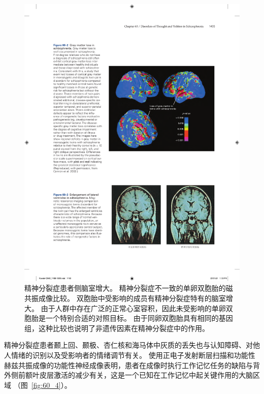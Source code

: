 \begin{figure}[htbp]
	\centering
	\includegraphics[width=0.88\linewidth]{chap60/fig_60_3}
	\caption{精神分裂症患者侧脑室增大。
		精神分裂症不一致的单卵双胞胎的磁共振成像比较。
		双胞胎中受影响的成员有精神分裂症特有的脑室增大。
		由于人群中存在广泛的正常心室容积，因此未受影响的单卵双胞胎是一个特别合适的对照目标。
		由于同卵双胞胎具有相同的基因组，这种比较也说明了非遗传因素在精神分裂症中的作用。}
	\label{fig:60_3}
\end{figure}


精神分裂症患者颞上回、颞极、杏仁核和海马体中灰质的丢失也与认知障碍、对他人情绪的识别以及受影响者的情绪调节有关。
使用正电子发射断层扫描和功能性赫兹共振成像的功能性神经成像表明，患者在成像时执行工作记忆任务的缺陷与背外侧前额叶皮层激活的减少有关，这是一个已知在工作记忆中起关键作用的大脑区域 （图~\ref{fig:60_4}）。


